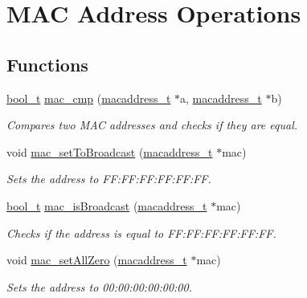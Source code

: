 \hypertarget{group__mac__operations}{}\section{M\+AC Address Operations}
\label{group__mac__operations}
\subsection*{Functions}
\begin{DoxyCompactItemize}
\item 
\mbox{\hyperlink{bool_8h_a449976458a084f880dc8e3d29e7eb6f5}{bool\+\_\+t}} \mbox{\hyperlink{group__mac__operations_ga87bc219b1c3eed3359777bee707a9eee}{mac\+\_\+cmp}} (\mbox{\hyperlink{group__ethernet_gacb865bcbf50a6c8cef05581bfabff373}{macaddress\+\_\+t}} $\ast$a, \mbox{\hyperlink{group__ethernet_gacb865bcbf50a6c8cef05581bfabff373}{macaddress\+\_\+t}} $\ast$b)
\begin{DoxyCompactList}\small\item\em Compares two M\+AC addresses and checks if they are equal. \end{DoxyCompactList}\item 
void \mbox{\hyperlink{group__mac__operations_ga84ade37d84a21b67f68df8ee4928d7d4}{mac\+\_\+set\+To\+Broadcast}} (\mbox{\hyperlink{group__ethernet_gacb865bcbf50a6c8cef05581bfabff373}{macaddress\+\_\+t}} $\ast$mac)
\begin{DoxyCompactList}\small\item\em Sets the address to F\+F\+:\+F\+F\+:\+F\+F\+:\+F\+F\+:\+FF\+:FF. \end{DoxyCompactList}\item 
\mbox{\hyperlink{bool_8h_a449976458a084f880dc8e3d29e7eb6f5}{bool\+\_\+t}} \mbox{\hyperlink{group__mac__operations_ga14cfb5be92e80b193d9b9e196bd2b7b6}{mac\+\_\+is\+Broadcast}} (\mbox{\hyperlink{group__ethernet_gacb865bcbf50a6c8cef05581bfabff373}{macaddress\+\_\+t}} $\ast$mac)
\begin{DoxyCompactList}\small\item\em Checks if the address is equal to F\+F\+:\+F\+F\+:\+F\+F\+:\+F\+F\+:\+FF\+:FF. \end{DoxyCompactList}\item 
void \mbox{\hyperlink{group__mac__operations_ga2d2d61d6c8965bcc6215ac86793ae141}{mac\+\_\+set\+All\+Zero}} (\mbox{\hyperlink{group__ethernet_gacb865bcbf50a6c8cef05581bfabff373}{macaddress\+\_\+t}} $\ast$mac)
\begin{DoxyCompactList}\small\item\em Sets the address to 00\+:00\+:00\+:00\+:00\+:00. \end{DoxyCompactList}\item 

\end{DoxyCompactItemize}
